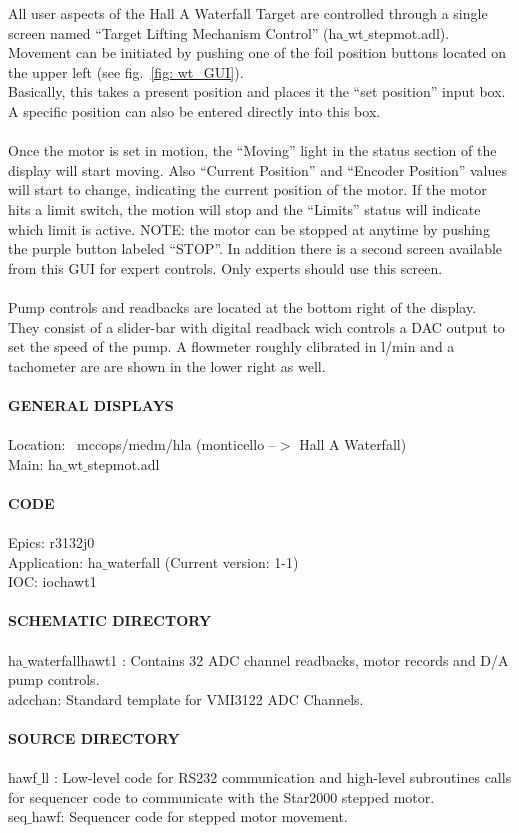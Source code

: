 All user aspects of the Hall A Waterfall Target are controlled through
a single screen named {}``Target Lifting Mechanism Control'' (ha$\_$wt$\_$stepmot.adl).\\
 Movement can be initiated by pushing one of the foil position buttons
located on the upper left (see fig.~\ref{fig: wt_GUI}).\\
 Basically, this takes a present position and places it the {}``set
position'' input box. A specific position can also be entered directly
into this box.\\
\\
 Once the motor is set in motion, the {}``Moving'' light in the
status section of the display will start moving. Also {}``Current
Position'' and {}``Encoder Position'' values will start to change,
indicating the current position of the motor. If the motor hits a
limit switch, the motion will stop and the {}``Limits'' status will
indicate which limit is active. NOTE: the motor can be stopped at
anytime by pushing the purple button labeled {}``STOP''. In addition
there is a second screen available from this GUI for expert controls.
Only experts should use this screen.\\
\\
 Pump controls and readbacks are located at the bottom right of the
display. They consist of a slider-bar with digital readback wich controls
a DAC output to set the speed of the pump. A flowmeter roughly clibrated
in l/min and a tachometer are are shown in the lower right as well.\\
\\
 \textbf{GENERAL DISPLAYS}\\
\\
 Location: ~mccops/medm/hla (monticello --$>$ Hall A Waterfall)
\\
 Main: ha$\_$wt$\_$stepmot.adl \\
\\
 \textbf{CODE}\\
\\
 Epics: r3132j0 \\
 Application: ha$\_$waterfall (Current version: 1-1) \\
 IOC: iochawt1 \\
\\
 \textbf{SCHEMATIC DIRECTORY}\\
\\
 ha$\_$waterfallhawt1 : Contains 32 ADC channel readbacks, motor
records and D/A pump controls.\\
 adcchan: Standard template for VMI3122 ADC Channels.\\
\\
 \textbf{SOURCE DIRECTORY}\\
\\
 hawf$\_$ll : Low-level code for RS232 communication and high-level
subroutines calls for sequencer code to communicate with the Star2000
stepped motor.\\
 seq$\_$hawf: Sequencer code for stepped motor movement.



